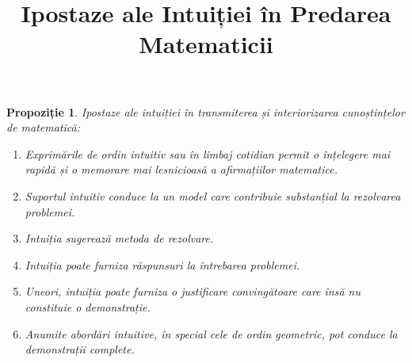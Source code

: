 \documentclass[12pt]{article}
\title{Ipostaze ale Intuiției în Predarea Matematicii}
\author{}
\date{}
\theoremstyle{definition}
\theoremstyle{plain}
\newtheorem{proposition}{Propoziție}
\begin{document}
\maketitle

\begin{proposition}
Ipostaze ale intuiției în transmiterea și interiorizarea cunoștințelor de matematică:
\begin{enumerate}
    \item Exprimările \emph{de ordin intuitiv} sau \emph{în limbaj cotidian} permit o înțelegere mai rapidă și o memorare mai lesnicioasă a afirmațiilor matematice.
    \item Suportul intuitiv conduce la un model care contribuie substanțial la rezolvarea problemei.
    \item Intuiția sugerează metoda de rezolvare.
    \item Intuiția poate furniza răspunsuri la întrebarea problemei.
    \item Uneori, intuiția poate furniza o justificare convingătoare care însă nu constituie o demonstrație.
    \item Anumite abordări intuitive, în special cele de ordin geometric, pot conduce la demonstrații complete.
\end{enumerate}
\end{proposition}
\end{document}
